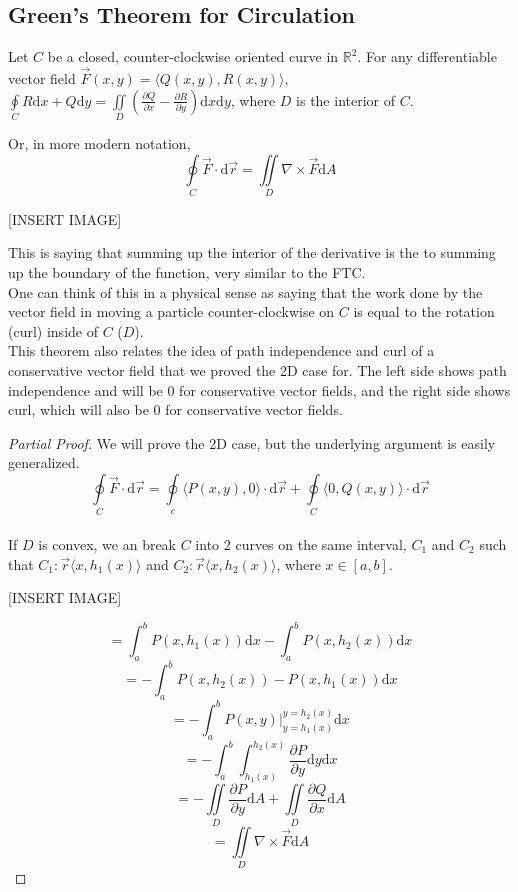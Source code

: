 \subsection{Green's Theorem for Circulation}
\begin{theorem}
	Let $C$ be a closed, counter-clockwise oriented curve in $\mathbb{R}^2$. For any differentiable vector field $\vec{F}(x,y)=\langle Q(x,y), R(x,y)\rangle$, $\oint\limits_{C}{R\mathrm{d}x+Q\mathrm{d}y}=\iint\limits_{D}{\left(\frac{\partial Q}{\partial x}-\frac{\partial R}{\partial y}\right)\mathrm{d}x\mathrm{d}y}$, where $D$ is the interior of $C$.
\end{theorem}
\noindent
Or, in more modern notation,
$$\oint\limits_{C}{\vec{F}\cdot\mathrm{d}\vec{r}}=\iint\limits_{D}{\nabla\times\vec{F}\mathrm{d}A}$$

[INSERT IMAGE]

\noindent
This is saying that summing up the interior of the derivative is the to summing up the boundary of the function, very similar to the FTC.\\
One can think of this in a physical sense as saying that the work done by the vector field in moving a particle counter-clockwise on $C$ is equal to the rotation (curl) inside of  $C$ ($D$).\\
This theorem also relates the idea of path independence and curl of a conservative vector field that we proved the 2D case for. The left side shows path independence and will be 0 for conservative vector fields, and the right side shows curl, which will also be 0 for conservative vector fields.

\begin{proof}[Partial Proof]
	We will prove the 2D case, but the underlying argument is easily generalized.\\
	$$\oint\limits_{C}{\vec{F}\cdot\mathrm{d}\vec{r}}=\oint\limits_{c}{\langle P(x,y), 0\rangle\cdot\mathrm{d}\vec{r}}+\oint\limits_{C}{\langle 0, Q(x,y)\rangle\cdot\mathrm{d}\vec{r}}$$\\
	If $D$ is convex, we an break $C$ into 2 curves on the same interval, $C_1$ and $C_2$ such that $C_1:\vec{r}\langle x, h_1(x)\rangle$ and $C_2:\vec{r}\langle x,h_2(x)\rangle$, where $x\in[a,b]$.
	
	[INSERT IMAGE]
	
	$$=\int_{a}^{b}{P(x,h_1(x))\mathrm{d}x}-\int_{a}^{b}{P(x,h_2(x))\mathrm{d}x}$$
	$$=-\int_{a}^{b}{P(x,h_2(x))-P(x,h_1(x))\mathrm{d}x}$$
	$$=-\int_{a}^{b}{P(x,y)\rvert_{y=h_1(x)}^{y=h_2(x)}\mathrm{d}x}$$
	$$=-\int_{a}^{b}{\int_{h_1(x)}^{h_2(x)}{\frac{\partial P}{\partial y}\mathrm{d}y}\mathrm{d}x}$$
	$$=-\iint\limits_{D}{\frac{\partial P}{\partial y}\mathrm{d}A}+\iint\limits_{D}{\frac{\partial Q}{\partial x}\mathrm{d}A}$$
	$$=\iint\limits_{D}{\nabla\times\vec{F}\mathrm{d}A}$$
\end{proof}

